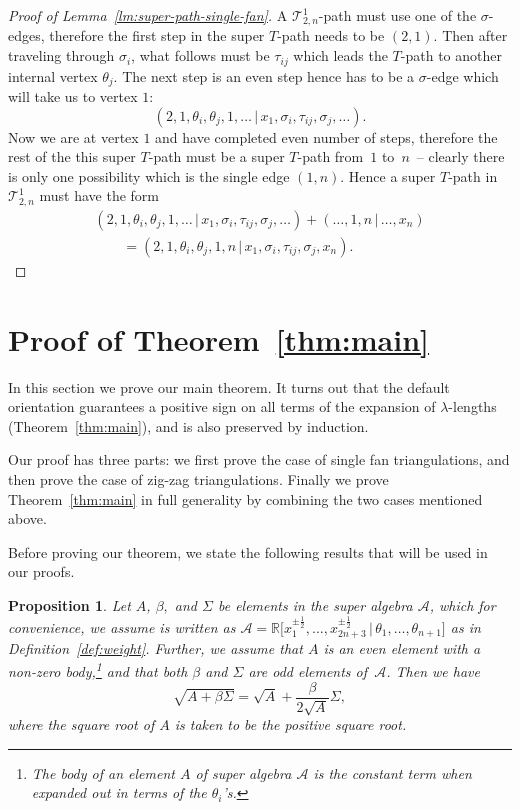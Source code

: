 \documentclass[11pt]{article}
\numberwithin{equation}{section}
\numberwithin{equation}{section}
\newtheorem{Proposition}[Theorem]{Proposition}
 {\theoremstyle{Definition}
\newtheorem{Definition}[Theorem]{Definition}
\newtheorem{Example}[Theorem]{Example}
\newtheorem{Remark}[Theorem]{Remark}
\newtheorem{Question}[Theorem]{Question} }
\begin{document}
\begin{proof}[Proof of Lemma~\ref{lm:super-path-single-fan}]
 A $\mathcal T^1_{2,n}$-path must use one of the $\sigma$-edges, therefore the first step in the super $T$-path needs to be $(2,1)$.
 Then after traveling through $\sigma_i$, what follows must be $\tau_{ij}$ which leads the $T$-path to another internal vertex $\theta_j$.
 The next step is an even step hence has to be a $\sigma$-edge which will take us to vertex $1$:
 \[(2,1,\theta_i,\theta_j,1,\dots\,|\,x_1,\sigma_i,\tau_{ij},\sigma_j,\dots).\]
 Now we are at vertex $1$ and have completed even number of steps, therefore the rest of the this super $T$-path must be a super $T$-path
 from~$1$ to~$n$~-- clearly there is only one possibility which is the single edge $(1,n)$.
 Hence a super $T$-path in $\mathcal T^1_{2,n}$ must have the form
 \begin{gather*}
 (2,1,\theta_i,\theta_j,1,\dots\,|\,x_1,\sigma_i,\tau_{ij},\sigma_j,\dots)+(\dots,1,n\,|\,\dots,x_n)\\
 \qquad{} =(2,1,\theta_i,\theta_j,1,n\,|\,x_1,\sigma_i,\tau_{ij},\sigma_j,x_n).\tag*{\qed}
 \end{gather*}\renewcommand{\qed}{}
\end{proof}

\section{Proof of Theorem~\ref{thm:main}}
\label{sec:proof}

In this section we prove our main theorem.
It turns out that the default orientation guarantees a positive sign on all terms of the expansion of
$\lambda$-lengths (Theorem~\ref{thm:main}), and is also preserved by induction.

Our proof has three parts: we first prove the case of single fan triangulations, and then prove the case of zig-zag triangulations. Finally we prove Theorem~\ref{thm:main} in full generality by combining the two cases mentioned above.

Before proving our theorem, we state the following results that will be used in our proofs.

\begin{Proposition} \label{lemma:theta32}
 Let $A$, $\beta,$ and $\Sigma$ be elements in the super algebra $\mathcal A$, which for convenience, we assume is written as
 $\mathcal A = {\mathbb R}\bigl[x_1^{\pm\frac{1}{2}},\dots,x_{2n+3}^{\pm\frac{1}{2}} \,|\, \theta_1,\dots,\theta_{n+1}\bigr]$ as in Definition~{\rm \ref{def:weight}}.
 Further, we assume that $A$ is an even element with a non-zero body,\footnote{The \emph{body} of an element $A$ of super algebra $\mathcal A$ is the constant term when expanded out in terms of the $\theta_i$'s.}
 and that both $\beta$ and $\Sigma$ are odd elements of~$\mathcal A$. Then we have
 \[\sqrt{A+\beta\Sigma}= \sqrt{A}+\frac{\beta}{2\sqrt{A}}\Sigma,\]
 where the square root of $A$ is taken to be the positive square root.
\end{Proposition}
\end{document}
